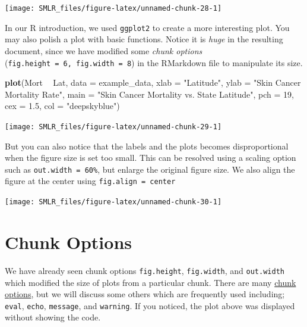 \documentclass[
]{book}
\newenvironment{Shaded}{\begin{snugshade}}{\end{snugshade}}
\newcommand{\DataTypeTok}[1]{\textcolor[rgb]{0.13,0.29,0.53}{#1}}
\newcommand{\DecValTok}[1]{\textcolor[rgb]{0.00,0.00,0.81}{#1}}
\newcommand{\FloatTok}[1]{\textcolor[rgb]{0.00,0.00,0.81}{#1}}
\newcommand{\KeywordTok}[1]{\textcolor[rgb]{0.13,0.29,0.53}{\textbf{#1}}}
\newcommand{\NormalTok}[1]{#1}
\newcommand{\OperatorTok}[1]{\textcolor[rgb]{0.81,0.36,0.00}{\textbf{#1}}}
\newcommand{\StringTok}[1]{\textcolor[rgb]{0.31,0.60,0.02}{#1}}
\begin{document}
\begin{flushleft}\texttt{[image: SMLR\_files/figure-latex/unnamed-chunk-28-1]} \end{flushleft}

In our R introduction, we used \texttt{ggplot2} to create a more interesting plot. You may also polish a plot with basic functions. Notice it is \emph{huge} in the resulting document, since we have modified some \emph{chunk options} (\texttt{fig.height\ =\ 6,\ fig.width\ =\ 8}) in the RMarkdown file to manipulate its size.

\begin{Shaded}
\begin{Highlighting}[]
  \KeywordTok{plot}\NormalTok{(Mort }\OperatorTok{~}\StringTok{ }\NormalTok{Lat, }\DataTypeTok{data =}\NormalTok{ example_data,}
       \DataTypeTok{xlab =} \StringTok{"Latitude"}\NormalTok{,}
       \DataTypeTok{ylab =} \StringTok{"Skin Cancer Mortality Rate"}\NormalTok{,}
       \DataTypeTok{main =} \StringTok{"Skin Cancer Mortality vs. State Latitude"}\NormalTok{,}
       \DataTypeTok{pch  =} \DecValTok{19}\NormalTok{,}
       \DataTypeTok{cex  =} \FloatTok{1.5}\NormalTok{,}
       \DataTypeTok{col  =} \StringTok{"deepskyblue"}\NormalTok{)}
\end{Highlighting}
\end{Shaded}

\begin{flushleft}\texttt{[image: SMLR\_files/figure-latex/unnamed-chunk-29-1]} \end{flushleft}

But you can also notice that the labels and the plots becomes disproportional when the figure size is set too small. This can be resolved using a scaling option such as \texttt{out.width\ =\ \textquotesingle{}60\%}, but enlarge the original figure size. We also align the figure at the center using \texttt{fig.align\ =\ \textquotesingle{}center\textquotesingle{}}

\begin{center}\texttt{[image: SMLR\_files/figure-latex/unnamed-chunk-30-1]} \end{center}

\hypertarget{chunk-options}{%
\section{Chunk Options}\label{chunk-options}}

We have already seen chunk options \texttt{fig.height}, \texttt{fig.width}, and \texttt{out.width} which modified the size of plots from a particular chunk. There are many \href{http://yihui.name/knitr/options/}{chunk options}, but we will discuss some others which are frequently used including; \texttt{eval}, \texttt{echo}, \texttt{message}, and \texttt{warning}. If you noticed, the plot above was displayed without showing the code.
\end{document}
